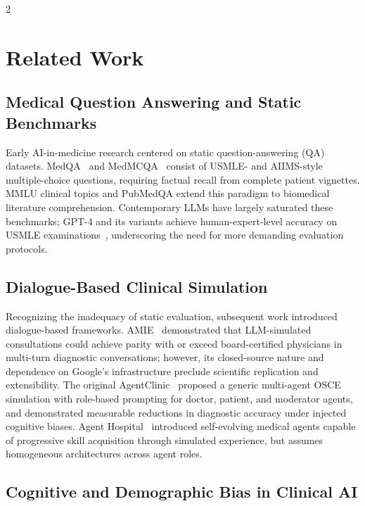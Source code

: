 \documentclass[10pt, a4paper]{article}
\begin{document}
\begin{multicols}{2}
\section{Related Work}
\label{sec:related}

\subsection{Medical Question Answering and Static Benchmarks}

Early AI-in-medicine research centered on static question-answering (QA) datasets. MedQA~\cite{jin2021disease} and MedMCQA~\cite{pal2022medmcqa} consist of USMLE- and AIIMS-style multiple-choice questions, requiring factual recall from complete patient vignettes. MMLU clinical topics and PubMedQA extend this paradigm to biomedical literature comprehension. Contemporary LLMs have largely saturated these benchmarks; GPT-4 and its variants achieve human-expert-level accuracy on USMLE examinations~\cite{nori2023capabilities,kanjee2023accuracy}, underscoring the need for more demanding evaluation protocols.

\subsection{Dialogue-Based Clinical Simulation}

Recognizing the inadequacy of static evaluation, subsequent work introduced dialogue-based frameworks. AMIE~\cite{tu2024towards} demonstrated that LLM-simulated consultations could achieve parity with or exceed board-certified physicians in multi-turn diagnostic conversations; however, its closed-source nature and dependence on Google's infrastructure preclude scientific replication and extensibility. The original AgentClinic~\cite{schmidgall2024agentclinic} proposed a generic multi-agent OSCE simulation with role-based prompting for doctor, patient, and moderator agents, and demonstrated measurable reductions in diagnostic accuracy under injected cognitive biases. Agent Hospital~\cite{li2024agent} introduced self-evolving medical agents capable of progressive skill acquisition through simulated experience, but assumes homogeneous architectures across agent roles.

\subsection{Cognitive and Demographic Bias in Clinical AI}


\end{multicols}
\end{document}
